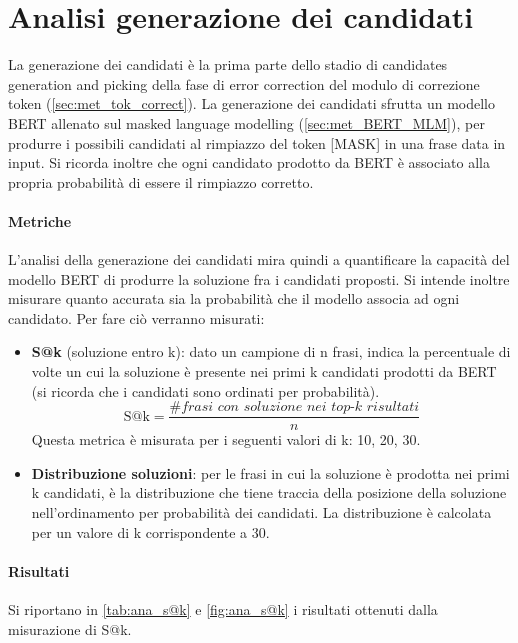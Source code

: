 \section{Analisi generazione dei candidati}
\label{sec:ana_bert}
La generazione dei candidati è la prima parte dello stadio di candidates generation and picking della fase di error correction del modulo di correzione token (\autoref{sec:met_tok_correct}). La generazione dei candidati sfrutta un modello BERT allenato sul masked language modelling (\autoref{sec:met_BERT_MLM}), per produrre i possibili candidati al rimpiazzo del token [MASK] in una frase data in input. Si ricorda inoltre che ogni candidato prodotto da BERT è associato alla propria probabilità di essere il rimpiazzo corretto.

\paragraph{Metriche} L'analisi della generazione dei candidati mira quindi a quantificare la capacità del modello BERT di produrre la soluzione fra i candidati proposti. Si intende inoltre misurare quanto accurata sia la probabilità che il modello associa ad ogni candidato. Per fare ciò verranno misurati:
\begin{itemize}
\item \textbf{S@k} (soluzione entro k): dato un campione di n frasi, indica la percentuale di volte un cui la soluzione è presente nei primi k candidati prodotti da BERT (si ricorda che i candidati sono ordinati per probabilità).
	\begin{equation}
	\text{S@k} = \frac{\textit{\# frasi con soluzione nei top-k risultati}}{n}
	\end{equation}
Questa metrica è misurata per i seguenti valori di k: 10, 20, 30.

\item \textbf{Distribuzione soluzioni}: per le frasi in cui la soluzione è prodotta nei primi k candidati, è la distribuzione che tiene traccia della posizione della soluzione nell'ordinamento per probabilità dei candidati. La distribuzione è calcolata per un valore di k corrispondente a 30.
\end{itemize}


\paragraph{Risultati}
Si riportano in \autoref{tab:ana_s@k} e \autoref{fig:ana_s@k} i risultati ottenuti dalla misurazione di S@k. 


